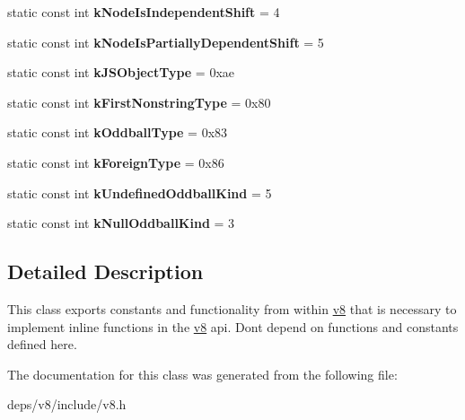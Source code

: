 \begin{DoxyCompactItemize}
\item 
\hypertarget{classv8_1_1internal_1_1_internals_a228b2b58c77c17bc512b92d9e3aea48b}{}static const int {\bfseries k\+Node\+Is\+Independent\+Shift} = 4\label{classv8_1_1internal_1_1_internals_a228b2b58c77c17bc512b92d9e3aea48b}

\item 
\hypertarget{classv8_1_1internal_1_1_internals_aeda4d6fc1bd10ca57398597f3bb496f3}{}static const int {\bfseries k\+Node\+Is\+Partially\+Dependent\+Shift} = 5\label{classv8_1_1internal_1_1_internals_aeda4d6fc1bd10ca57398597f3bb496f3}

\item 
\hypertarget{classv8_1_1internal_1_1_internals_a56b7062df5d9a7df491137d4c3341bcc}{}static const int {\bfseries k\+J\+S\+Object\+Type} = 0xae\label{classv8_1_1internal_1_1_internals_a56b7062df5d9a7df491137d4c3341bcc}

\item 
\hypertarget{classv8_1_1internal_1_1_internals_a6f4a54927b01a11f444fb2f00b47ca1d}{}static const int {\bfseries k\+First\+Nonstring\+Type} = 0x80\label{classv8_1_1internal_1_1_internals_a6f4a54927b01a11f444fb2f00b47ca1d}

\item 
\hypertarget{classv8_1_1internal_1_1_internals_a13081e936f8c96472f1b1496c70d4dc1}{}static const int {\bfseries k\+Oddball\+Type} = 0x83\label{classv8_1_1internal_1_1_internals_a13081e936f8c96472f1b1496c70d4dc1}

\item 
\hypertarget{classv8_1_1internal_1_1_internals_a263195f36f9e8ee64af70dc267a85d55}{}static const int {\bfseries k\+Foreign\+Type} = 0x86\label{classv8_1_1internal_1_1_internals_a263195f36f9e8ee64af70dc267a85d55}

\item 
\hypertarget{classv8_1_1internal_1_1_internals_a39072b9e0ffea4031f4a1c514208b20d}{}static const int {\bfseries k\+Undefined\+Oddball\+Kind} = 5\label{classv8_1_1internal_1_1_internals_a39072b9e0ffea4031f4a1c514208b20d}

\item 
\hypertarget{classv8_1_1internal_1_1_internals_a72243c5512cb5cab9d10b6f29e775180}{}static const int {\bfseries k\+Null\+Oddball\+Kind} = 3\label{classv8_1_1internal_1_1_internals_a72243c5512cb5cab9d10b6f29e775180}

\end{DoxyCompactItemize}


\subsection{Detailed Description}
This class exports constants and functionality from within \hyperlink{namespacev8}{v8} that is necessary to implement inline functions in the \hyperlink{namespacev8}{v8} api. Don\textquotesingle{}t depend on functions and constants defined here. 

The documentation for this class was generated from the following file\+:\begin{DoxyCompactItemize}
\item 
deps/v8/include/v8.\+h\end{DoxyCompactItemize}

